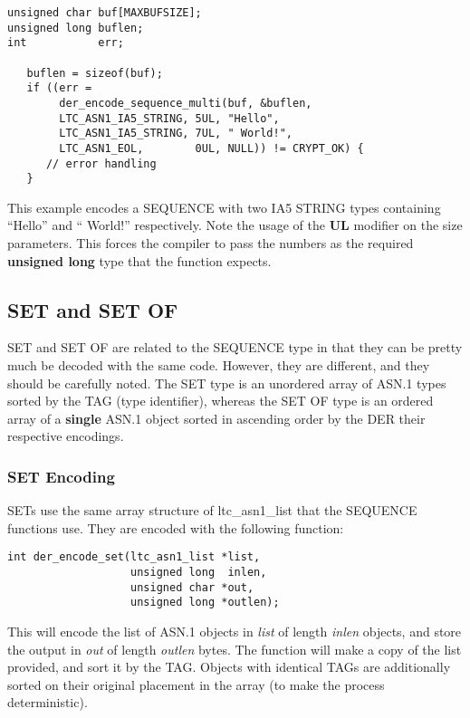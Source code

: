 \documentclass[synpaper]{book}
\begin{document}
\begin{small}
\begin{verbatim}
unsigned char buf[MAXBUFSIZE];
unsigned long buflen;
int           err;

   buflen = sizeof(buf);
   if ((err =
        der_encode_sequence_multi(buf, &buflen,
        LTC_ASN1_IA5_STRING, 5UL, "Hello",
        LTC_ASN1_IA5_STRING, 7UL, " World!",
        LTC_ASN1_EOL,        0UL, NULL)) != CRYPT_OK) {
      // error handling
   }
\end{verbatim}
\end{small}

This example encodes a SEQUENCE with two IA5 STRING types containing ``Hello'' and `` World!'' respectively.  Note the usage of the \textbf{UL} modifier
on the size parameters.  This forces the compiler to pass the numbers as the required \textbf{unsigned long} type that the function expects.

\subsection{SET and SET OF}

 
SET and SET OF are related to the SEQUENCE type in that they can be pretty much be decoded with the same code.  However, they are different, and they should
be carefully noted.  The SET type is an unordered array of ASN.1 types sorted by the TAG (type identifier), whereas the SET OF type is an ordered array of
a \textbf{single} ASN.1 object sorted in ascending order by the DER their respective encodings.

\subsubsection{SET Encoding}

SETs use the same array structure of ltc\_asn1\_list that the SEQUENCE functions use.  They are encoded with the following function:

\begin{verbatim}
int der_encode_set(ltc_asn1_list *list,
                   unsigned long  inlen,
                   unsigned char *out,
                   unsigned long *outlen);
\end{verbatim}

This will encode the list of ASN.1 objects in \textit{list} of length \textit{inlen} objects, and store the output in \textit{out} of length \textit{outlen} bytes.
The function will make a copy of the list provided, and sort it by the TAG.  Objects with identical TAGs are additionally sorted on their original placement in the
array (to make the process deterministic).
\end{document}
